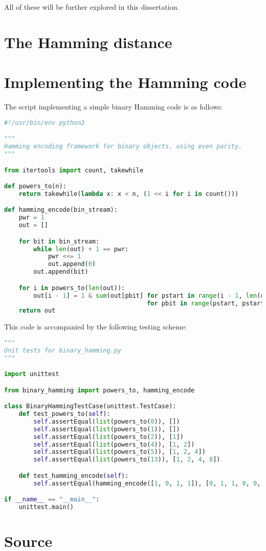\documentclass{article}
\begin{document}
    All of these will be further explored in this dissertation.

    \section{The Hamming distance}

    \section{Implementing the Hamming code}

    The script implementing a simple binary Hamming code is as follows:

\begin{lstlisting}[language=Python, caption=Binary Hamming code in Python]
#!/usr/bin/env python3

"""
Hamming encoding framework for binary objects, using even parity.
"""

from itertools import count, takewhile

def powers_to(n):
    return takewhile(lambda x: x < n, (1 << i for i in count()))

def hamming_encode(bin_stream):
    pwr = 1
    out = []

    for bit in bin_stream:
        while len(out) + 1 == pwr:
            pwr <<= 1
            out.append(0)
        out.append(bit)

    for i in powers_to(len(out)):
        out[i - 1] = 1 & sum(out[pbit] for pstart in range(i - 1, len(out), i << 1)
                                       for pbit in range(pstart, pstart + i))
    return out
\end{lstlisting}

    This code is accompanied by the following testing scheme:

\begin{lstlisting}[language=Python, caption=binary\_hamming unit tests]
"""
Unit tests for binary_hamming.py
"""

import unittest

from binary_hamming import powers_to, hamming_encode

class BinaryHammingTestCase(unittest.TestCase):
    def test_powers_to(self):
        self.assertEqual(list(powers_to(0)), [])
        self.assertEqual(list(powers_to(1)), [])
        self.assertEqual(list(powers_to(2)), [1])
        self.assertEqual(list(powers_to(4)), [1, 2])
        self.assertEqual(list(powers_to(5)), [1, 2, 4])
        self.assertEqual(list(powers_to(13)), [1, 2, 4, 8])

    def test_hamming_encode(self):
        self.assertEqual(hamming_encode([1, 0, 1, 1]), [0, 1, 1, 0, 0, 1, 1])

if __name__ == "__main__":
    unittest.main()
\end{lstlisting}

    \section{Source}

\nocite{CodeIntro}
\nocite{Hamming}
\nocite{HammingBarcodes}
\nocite{Shannon}
{}

\end{document}
